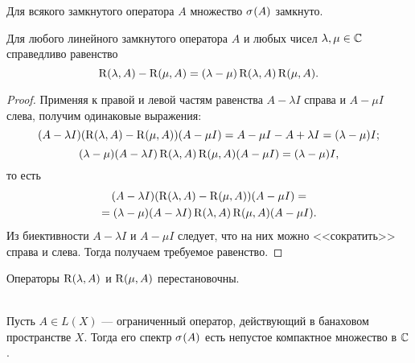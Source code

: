 \begin{corollaryth}
    Для всякого замкнутого оператора $A$ множество $\spectrum{A}$ замкнуто.
\end{corollaryth}

\vspace{0.5cm}

\begin{theorem}
    Для любого линейного замкнутого оператора $A$ и любых чисел $\lambda, \mu \in \mathbb{C}$ 
    справедливо равенство
    \[ \operatorname{R}(\lambda, A) - \operatorname{R}(\mu, A) 
        = (\lambda - \mu) \operatorname{R}(\lambda, A)\operatorname{R}(\mu, A). \]
\end{theorem}

\begin{proof}
    Применяя к правой и левой частям равенства $A - \lambda I$ справа и $A - \mu I$ слева, получим
    одинаковые выражения:
    \[ (A - \lambda I)(\operatorname{R}(\lambda, A) - \operatorname{R}(\mu, A))(A - \mu I) = 
    A - \mu I - A + \lambda I = (\lambda - \mu) I; \]
    \[ (\lambda - \mu)(A - \lambda I)\operatorname{R}(\lambda, A)\operatorname{R}(\mu, A)(A - \mu I) = 
    (\lambda - \mu) I, \]
    то есть
    \begin{multline*}
        (A - \lambda I)(\operatorname{R}(\lambda, A) - \operatorname{R}(\mu, A))(A - \mu I) =\\=
          (\lambda - \mu)(A - \lambda I)\operatorname{R}(\lambda, A)\operatorname{R}(\mu, A)(A - \mu I).
    \end{multline*} 
    Из биективности $A - \lambda I$ и $A - \mu I$ следует, что на них можно <<сократить>>
    справа и слева. Тогда получаем требуемое равенство.
\end{proof}

\begin{corollaryth}
    Операторы $\operatorname{R}(\lambda, A)$ и $\operatorname{R}(\mu, A)$ перестановочны.
\end{corollaryth}

\vspace{0.5cm}

\begin{theorem}\label{th:boundedspectrum}\hfill\\
    \indent Пусть $A \in L(X)$ --- ограниченный оператор, действующий в банаховом пространстве $X$.
    Тогда его спектр $\spectrum{A}$ есть непустое компактное множество в $\mathbb{C}$.
\end{theorem}

